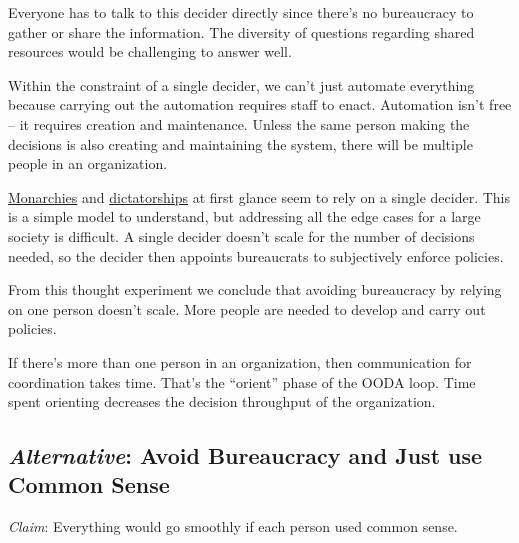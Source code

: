 Everyone has to talk to this decider directly since there's no bureaucracy to gather or share the information. The diversity of questions regarding shared resources would be challenging to answer well.

Within the constraint of a single decider, we can't just automate everything because carrying out the automation requires staff to enact. 
Automation isn't free -- it requires creation and maintenance. Unless the same person making the decisions is also creating and maintaining the system, there will be multiple people in an organization.


\href{https://en.wikipedia.org/wiki/Monarchy}{Monarchies} 
\iftoggle{WPinmargin}{\marginpar{$>$Wikipedia: Monarchy}}{} 
and 
\href{https://en.wikipedia.org/wiki/Dictator}{dictatorships}
at first glance seem to rely on a single decider. This is a simple model to understand, but addressing all the edge cases for a large society is difficult. A single decider doesn't scale for the number of decisions needed, so the decider then appoints bureaucrats to subjectively enforce policies. 

From this thought experiment we conclude that avoiding bureaucracy by relying on one person doesn't scale. More people are needed to develop and carry out policies. 




If there's more than one person in an organization, then communication for coordination takes time. That's the ``orient'' phase of the OODA loop. Time spent orienting decreases the decision throughput of the organization.



\subsection*{\textit{Alternative}: Avoid Bureaucracy and Just use Common Sense}
\textit{Claim}: Everything would go smoothly if each person used common sense.

